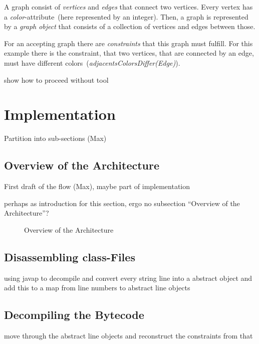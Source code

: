 \documentclass[conference]{IEEEtran}
\begin{document}
A graph consist of \emph{vertices} and \emph{edges} that connect two vertices.
Every vertex has a \emph{color}-attribute~(here represented by an integer).
Then, a graph is represented by a \emph{graph object} that consists of a
collection of vertices and edges between those.

For an accepting graph there are \emph{constraints} that this graph must
fulfill. For this example there is the constraint, that two vertices, that are
connected by an edge, must have different
colors~(\emph{adjacentsColorsDiffer(Edge)}).

\danger show how to proceed without tool

\section{Implementation}
\label{sec:implementation}

\danger Partition into sub-sections (Max)

\subsection{Overview of the Architecture}
\label{sec:impl_overv-arch}

\danger First draft of the flow (Max), maybe part of implementation

\danger perhaps as introduction for this section, ergo no subsection ``Overview
of the Architecture''?

\begin{figure*}[!ht]
  \centering
  \label{fig:architecture}
  \tikzarchitecture
  \caption{Overview of the Architecture}
\end{figure*}

\subsection{Disassembling class-Files}
\label{sec:impl_disassembling}

\danger using javap to decompile and convert every string line into a abstract
object and add this to a map from line numbers to abstract line objects

\subsection{Decompiling the Bytecode}
\label{sec:impl_decompiling}

\danger move through the abstract line objects and reconstruct the constraints
from that
\end{document}
